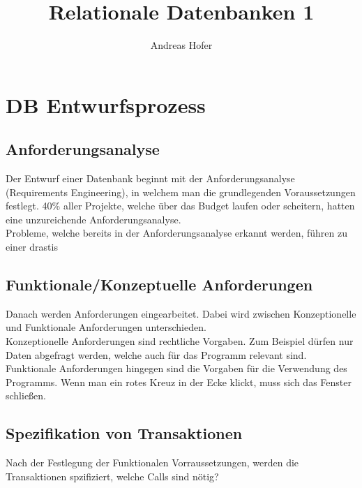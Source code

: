 \documentclass{article}
\title{\vspace{-1cm}Relationale Datenbanken 1}
\author{Andreas Hofer}
\begin{document}
	\maketitle
	\tableofcontents
	\newpage
	\section{DB Entwurfsprozess}
	\subsection{Anforderungsanalyse}
	Der Entwurf einer Datenbank beginnt mit der Anforderungsanalyse (Requirements Engineering), in welchem man die grundlegenden Voraussetzungen festlegt. 40\% aller Projekte, welche über das Budget laufen oder scheitern, hatten eine unzureichende Anforderungsanalyse. \\
	Probleme, welche bereits in der Anforderungsanalyse erkannt werden, führen zu einer drastis
	\subsection{Funktionale/Konzeptuelle Anforderungen}
	Danach werden Anforderungen eingearbeitet. Dabei wird zwischen Konzeptionelle und Funktionale Anforderungen unterschieden. \\
	Konzeptionelle Anforderungen sind rechtliche Vorgaben. Zum Beispiel dürfen nur Daten abgefragt werden, welche auch für das Programm relevant sind. \\
	Funktionale Anforderungen hingegen sind die Vorgaben für die Verwendung des Programms. Wenn man ein rotes Kreuz in der Ecke klickt, muss sich das Fenster schließen. \\
	\subsection{Spezifikation von Transaktionen}
	Nach der Festlegung der Funktionalen Vorraussetzungen, werden die Transaktionen spzifiziert, welche Calls sind nötig?
\end{document}
